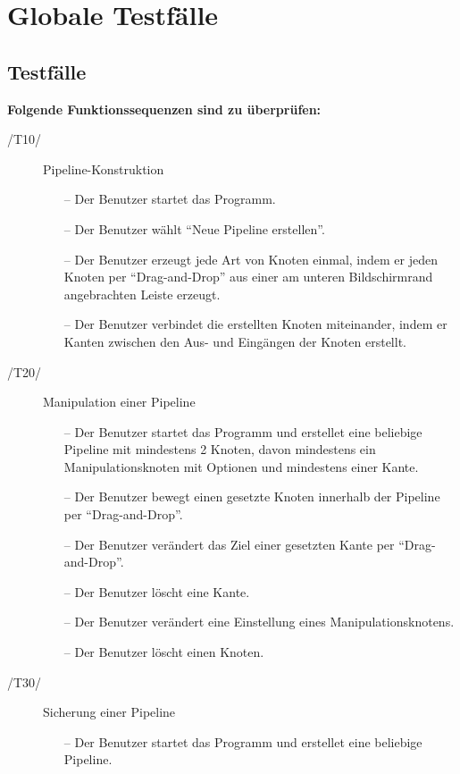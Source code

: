 \section{Globale Testfälle}

\subsection{Testfälle}

\textbf{Folgende Funktionssequenzen sind zu überprüfen:}

\begin{description}
	\item[/T10/] Pipeline-Konstruktion
		\begin{itemize}
			\item[--] Der Benutzer startet das Programm.
			\item[--] Der Benutzer wählt ``Neue Pipeline erstellen''.
			\item[--] Der Benutzer erzeugt jede Art von Knoten einmal, indem er jeden Knoten per ``Drag-and-Drop'' aus einer am unteren Bildschirmrand
				angebrachten Leiste erzeugt.
			\item[--] Der Benutzer verbindet die erstellten Knoten miteinander, indem er Kanten zwischen den Aus- und Eingängen der Knoten erstellt.
		\end{itemize}
	\item[/T20/] Manipulation einer Pipeline
		\begin{itemize}
			\item[--] Der Benutzer startet das Programm und erstellet eine beliebige Pipeline mit mindestens 2 Knoten, davon mindestens ein Manipulationsknoten mit Optionen 
				und mindestens einer Kante.
			\item[--] Der Benutzer bewegt einen gesetzte Knoten innerhalb der Pipeline per ``Drag-and-Drop''.
			\item[--] Der Benutzer verändert das Ziel einer gesetzten Kante per ``Drag-and-Drop''.
			\item[--] Der Benutzer löscht eine Kante.
			\item[--] Der Benutzer verändert eine Einstellung eines Manipulationsknotens.
			\item[--] Der Benutzer löscht einen Knoten.
		\end{itemize}
	\item[/T30/] Sicherung einer Pipeline
		\begin{itemize}
			\item[--] Der Benutzer startet das Programm und erstellet eine beliebige Pipeline.

\end{itemize}
\end{description}
